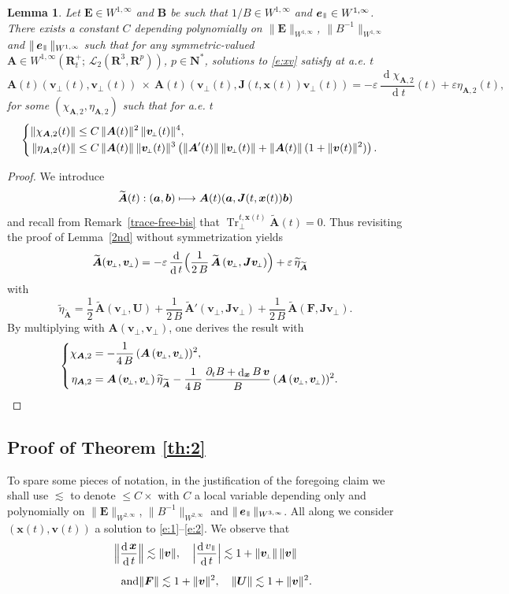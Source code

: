 \documentclass[10pt]{amsart}
\let\mathcal\mathscr
\newenvironment{splitcases}
{\begin{cases}\begin{aligned}}
{\end{aligned}\end{cases}}
\newcommand\mto{\mathchoice{\longmapsto}{\mapsto}{\mapsto}{\mapsto}}
\newcommand{\sperp}{{\scriptscriptstyle\perp}}
\let\eps\varepsilon
\let\d\partial
\DeclareMathOperator\dD{d}\let\dd\dD
\DeclareMathOperator{\Tr}{Tr}
\theoremstyle{plain}
\newtheorem{lemma}[theorem]{Lemma}
\theoremstyle{definition}
\newcommand{\bl}{\begin{lemma}}
\newcommand{\el}{\end{lemma}}
\newcommand\R{\mathbf R}
\newcommand{\N}{\mathbf N}
\newcommand\bA{{\boldsymbol A}}
\newcommand\bB{{\boldsymbol B}}
\newcommand\bE{{\boldsymbol E}}
\newcommand\bF{{\boldsymbol F}}
\newcommand\bJ{{\boldsymbol J}}
\newcommand\bU{{\boldsymbol U}}
\newcommand\bfa{{\boldsymbol a}}
\newcommand\bfb{{\boldsymbol b}}
\newcommand\bfv{{\boldsymbol v}}
\newcommand\bfx{{\boldsymbol x}}
\newcommand\cL{{\mathcal L}}
\newcommand\teta{{\widetilde \eta}}
\newcommand\tbA{\widetilde{\bA}}
\DeclareMathOperator{\beD}{\boldsymbol{e}}
\newcommand\eDpar{\beD_\mypar}
\newcommand\vpar{v_\mypar}
\newcommand\bvperp{\bfv_{\!\sperp}}
\newcommand{\Trperp}[1]{\Tr_\sperp^{#1}}
\newcommand{\mypar}{{\mkern3mu\vphantom{\perp}\vrule depth 0pt\mkern2mu\vrule depth 0pt\mkern3mu}}
\begin{document}
\bl
\label{4th-specific}
Let $\bE\in W^{1,\infty}$ and $\bB$ be such that $1/B\in W^{1,\infty}$ and $\eDpar\in W^{1,\infty}$. There exists a constant $C$ depending polynomially on $\|\bE\|_{W^{1,\infty}}$, $\|B^{-1}\|_{W^{1,\infty}}$ and $\|\eDpar\|_{W^{1,\infty}}$ such that for any symmetric-valued $\bA\in W^{1,\infty}\left(\R^+_t;\,\cL_2(\R^3,\R^p)\right)$, $p\in\N^*$, solutions to \eqref{e:xv} satisfy at a.e. $t$
\[
\bA(t)(\bvperp(t),\bvperp(t))
\ \times\ \bA(t)(\bvperp(t),\bJ(t,\bfx(t))\bvperp(t))
=-\eps\,\frac{\dD\chi_{\bA,2}}{\dD t}(t)+\eps\eta_{\bA,2}(t),
\]
for some $(\chi_{\bA,2},\eta_{\bA,2})$ such that for a.e. $t$
\[
\begin{splitcases}
\|\chi_{\bA,2}(t)\| &\leq C\,\|\bA(t)\|^2\,\|\bvperp(t)\|^4,
\\
\|\eta_{\bA,2}(t)\| &\leq C\,\|\bA(t)\|\,\|\bvperp(t)\|^3\left(\|\bA'(t)\|\,\|\bvperp(t)\|
+\|\bA(t)\|\,(1+\|\bfv(t)\|^2)\right).
\end{splitcases}
\]
\el
\begin{proof}
We introduce
\[
\tbA(t):(\bfa,\bfb)\mto \bA(t)(\bfa,\bJ(t,\bfx(t))\bfb)
\]
and recall from Remark~\ref{trace-free-bis} that $\Trperp{t,\bfx(t)}\tbA(t)=0$. Thus revisiting the proof of Lemma~\ref{2nd} without symmetrization yields
\begin{align*}
\tbA(\bvperp,\bvperp)
&=-\eps\,\frac{\dD}{\dD t}\Bigl(\frac{1}{2\,B}\,\tbA\left(\bvperp,\bJ\bvperp\right)\Bigr)+\eps\,\teta_{\tbA}
\end{align*}
with
\[
\teta_{\tbA}=\frac12\,\tbA(\bvperp,\bU)
+\frac{1}{2\,B}\,\tbA'\left(\bvperp,\bJ\bvperp\right)
+\frac{1}{2\,B}\,\tbA\left(\bF,\bJ\bvperp\right).
\]
By multiplying with $\bA(\bvperp,\bvperp)$, one derives the result with
\[
\begin{splitcases}
\chi_{\bA,2}&=-\frac{1}{4\,B}\,(\bA\left(\bvperp,\bvperp\right))^2,
\\
\eta_{\bA,2}&=\bA\left(\bvperp,\bvperp\right)\teta_{\tbA}
-\frac{1}{4\,B}\,\frac{\d_tB+\dD_\bfx B\,\bfv}{B}\,(\bA\left(\bvperp,\bvperp\right))^2.
\end{splitcases}
\]
\end{proof}

\subsection{Proof of Theorem \ref{th:2}}
\label{sec:proofTh2}

To spare some pieces of notation, in the justification of the foregoing claim we shall use $\lesssim$ to denote $\leq C\times$ with $C$ a local variable depending only and polynomially on $\|\bE\|_{W^{2,\infty}}$, $\|B^{-1}\|_{W^{2,\infty}}$ and $\|\eDpar\|_{W^{3,\infty}}$. All along we consider $(\bfx(t),\bfv(t))$ a solution to \eqref{e:1}--\eqref{e:2}. We observe that
\begin{gather*}
\Bigl\|\frac{\dD\bfx}{\dD t}\Bigr\|\lesssim \|\bfv\|,\quad
\Bigl|\frac{\dD\vpar}{\dD t}\Bigr| \lesssim 1+\|\bvperp\|\,\|\bfv\|\\[5pt]
\tag*{and}
\|\bF\|\lesssim 1+\|\bfv\|^2,\quad
\|\bU\|\lesssim 1+\|\bfv\|^2.
\end{gather*}
\end{document}
